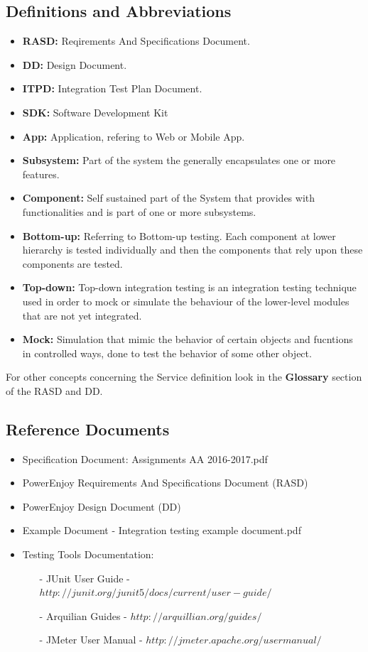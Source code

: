 \documentclass[a4paper]{article}
\begin{document}
\subsection{Definitions and Abbreviations}
\begin{itemize}
\item \textbf{RASD:} Reqirements And Specifications Document.
\item \textbf{DD:} Design Document.
\item \textbf{ITPD:} Integration Test Plan Document.
\item \textbf{SDK:} Software Development Kit
\item \textbf{App:} Application, refering to Web or Mobile App.
\item \textbf{Subsystem:} Part of the system the generally encapsulates one or more features.
\item \textbf{Component:} Self sustained part of the System that provides with functionalities and is part of one or more subsystems.
\item \textbf{Bottom-up:} Referring to Bottom-up testing. Each component at lower hierarchy is tested individually and then the components that rely upon these components are tested.
\item \textbf{Top-down:} Top-down integration testing is an integration testing technique used in order to mock or simulate the behaviour of the lower-level modules that are not yet integrated.
\item \textbf{Mock:} Simulation that mimic the behavior of certain objects and fucntions in controlled ways, done to test the behavior of some other object.
\end{itemize}
For other concepts concerning the Service definition look in the \textbf{Glossary} section of the RASD and DD.

\subsection{Reference Documents}
\begin{itemize}
\item Specification Document: Assignments AA 2016-2017.pdf
\item PowerEnjoy Requirements And Specifications Document (RASD)
\item PowerEnjoy Design Document (DD)
\item Example Document - Integration testing example document.pdf
\item Testing Tools Documentation:
\begin{itemize}
\item[-] JUnit User Guide - \(http://junit.org/junit5/docs/current/user-guide/\)
\item[-] Arquilian Guides - \(http://arquillian.org/guides/\)
\item[-] JMeter User Manual - \(http://jmeter.apache.org/usermanual/\) 
\end{itemize}
\end{itemize}
\end{document}
